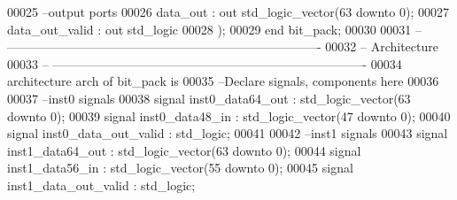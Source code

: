\begin{DoxyCode}
00025 \textcolor{keyword}{        --output ports }
00026         \textcolor{vhdlchar}{data_out}        \textcolor{vhdlchar}{:} \textcolor{keywordflow}{out} \textcolor{comment}{std\_logic\_vector}\textcolor{vhdlchar}{(}\textcolor{vhdllogic}{}\textcolor{vhdllogic}{63} \textcolor{keywordflow}{downto} \textcolor{vhdllogic}{}\textcolor{vhdllogic}{0}\textcolor{vhdlchar}{)};
00027         \textcolor{vhdlchar}{data_out_valid}  \textcolor{vhdlchar}{:} \textcolor{keywordflow}{out} \textcolor{comment}{std\_logic}       
00028         \textcolor{vhdlchar}{)};
00029 \textcolor{keywordflow}{end} \textcolor{vhdlchar}{bit\_pack};
00030 
00031 \textcolor{keyword}{-- ----------------------------------------------------------------------------}
00032 \textcolor{keyword}{-- Architecture}
00033 \textcolor{keyword}{-- ----------------------------------------------------------------------------}
00034 \textcolor{keywordflow}{architecture} arch \textcolor{keywordflow}{of} bit_pack is
00035 \textcolor{keyword}{--Declare signals,  components here}
00036 
00037 \textcolor{keyword}{--inst0 signals}
00038 \textcolor{keywordflow}{signal} \textcolor{vhdlchar}{inst0_data64_out}         \textcolor{vhdlchar}{:} \textcolor{comment}{std\_logic\_vector}\textcolor{vhdlchar}{(}\textcolor{vhdllogic}{}\textcolor{vhdllogic}{63} \textcolor{keywordflow}{downto} \textcolor{vhdllogic}{}\textcolor{vhdllogic}{0}\textcolor{vhdlchar}{)};
00039 \textcolor{keywordflow}{signal} \textcolor{vhdlchar}{inst0_data48_in}        \textcolor{vhdlchar}{:} \textcolor{comment}{std\_logic\_vector}\textcolor{vhdlchar}{(}\textcolor{vhdllogic}{}\textcolor{vhdllogic}{47} \textcolor{keywordflow}{downto} \textcolor{vhdllogic}{}\textcolor{vhdllogic}{0}\textcolor{vhdlchar}{)};
00040 \textcolor{keywordflow}{signal} \textcolor{vhdlchar}{inst0_data_out_valid} \textcolor{vhdlchar}{:} \textcolor{comment}{std\_logic};
00041 
00042 \textcolor{keyword}{--inst1 signals}
00043 \textcolor{keywordflow}{signal} \textcolor{vhdlchar}{inst1_data64_out}         \textcolor{vhdlchar}{:} \textcolor{comment}{std\_logic\_vector}\textcolor{vhdlchar}{(}\textcolor{vhdllogic}{}\textcolor{vhdllogic}{63} \textcolor{keywordflow}{downto} \textcolor{vhdllogic}{}\textcolor{vhdllogic}{0}\textcolor{vhdlchar}{)};
00044 \textcolor{keywordflow}{signal} \textcolor{vhdlchar}{inst1_data56_in}        \textcolor{vhdlchar}{:} \textcolor{comment}{std\_logic\_vector}\textcolor{vhdlchar}{(}\textcolor{vhdllogic}{}\textcolor{vhdllogic}{55} \textcolor{keywordflow}{downto} \textcolor{vhdllogic}{}\textcolor{vhdllogic}{0}\textcolor{vhdlchar}{)};
00045 \textcolor{keywordflow}{signal} \textcolor{vhdlchar}{inst1_data_out_valid} \textcolor{vhdlchar}{:} \textcolor{comment}{std\_logic};

\end{DoxyCode}
